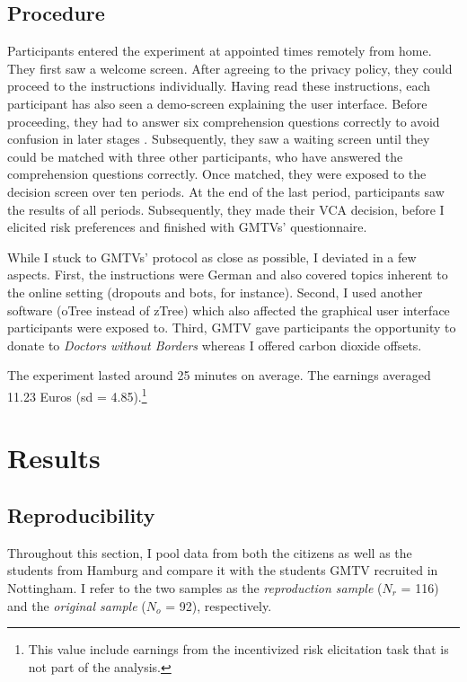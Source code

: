 \documentclass[
  authoryear,
  review,
  3p,
  onecolumn]{elsarticle}
\begin{document}
\hypertarget{sec-procedure}{%
\subsection{Procedure}\label{sec-procedure}}

Participants entered the experiment at appointed times remotely from
home. They first saw a welcome screen. After agreeing to the privacy
policy, they could proceed to the instructions individually. Having read
these instructions, each participant has also seen a demo-screen
explaining the user interface. Before proceeding, they had to answer six
comprehension questions correctly to avoid confusion in later stages
\citep{FerraroVossler2010}. Subsequently, they saw a waiting screen
until they could be matched with three other participants, who have
answered the comprehension questions correctly. Once matched, they were
exposed to the decision screen over ten periods. At the end of the last
period, participants saw the results of all periods. Subsequently, they
made their VCA decision, before I elicited risk preferences
\citep{HoltLaury2002} and finished with GMTVs' questionnaire.

While I stuck to GMTVs' protocol as close as possible, I deviated in a
few aspects. First, the instructions were German and also covered topics
inherent to the online setting (dropouts and bots, for instance).
Second, I used another software (oTree instead of zTree) which also
affected the graphical user interface participants were exposed to.
Third, GMTV gave participants the opportunity to donate to \emph{Doctors
without Borders} whereas I offered carbon dioxide offsets.

The experiment lasted around 25 minutes on average. The earnings
averaged 11.23 Euros (sd = 4.85).\footnote{This value include earnings
  from the incentivized risk elicitation task that is not part of the
  analysis.}

\hypertarget{sec-results}{%
\section{Results}\label{sec-results}}

\hypertarget{sec-replication}{%
\subsection{Reproducibility}\label{sec-replication}}

Throughout this section, I pool data from both the citizens as well as
the students from Hamburg and compare it with the students GMTV
recruited in Nottingham. I refer to the two samples as the
\emph{reproduction sample} (\(N_r\) = 116) and the \emph{original
sample} (\(N_o\) = 92), respectively.
\end{document}
